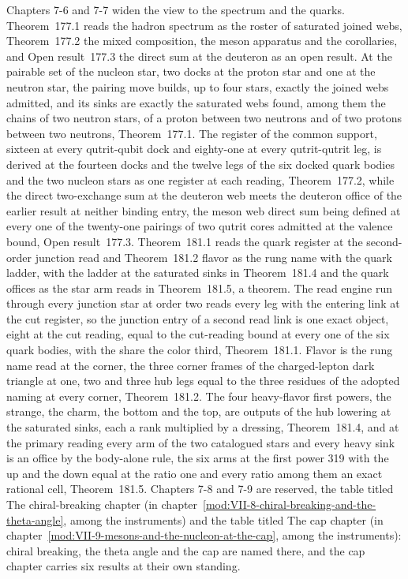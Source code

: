 Chapters 7-6 and 7-7 widen the view to the spectrum and the quarks. Theorem~177.1 reads the hadron spectrum as the roster of saturated joined webs, Theorem~177.2 the mixed composition, the meson apparatus and the corollaries, and Open result~177.3 the direct sum at the deuteron as an open result. At the pairable set of the nucleon star, two docks at the proton star and one at the neutron star, the pairing move builds, up to four stars, exactly the joined webs admitted, and its sinks are exactly the saturated webs found, among them the chains of two neutron stars, of a proton between two neutrons and of two protons between two neutrons, Theorem~177.1. The register of the common support, sixteen at every qutrit-qubit dock and eighty-one at every qutrit-qutrit leg, is derived at the fourteen docks and the twelve legs of the six docked quark bodies and the two nucleon stars as one register at each reading, Theorem~177.2, while the direct two-exchange sum at the deuteron web meets the deuteron office of the earlier result at neither binding entry, the meson web direct sum being defined at every one of the twenty-one pairings of two qutrit cores admitted at the valence bound, Open result~177.3. Theorem~181.1 reads the quark register at the second-order junction read and Theorem~181.2 flavor as the rung name with the quark ladder, with the ladder at the saturated sinks in Theorem~181.4 and the quark offices as the star arm reads in Theorem~181.5, a theorem. The read engine run through every junction star at order two reads every leg with the entering link at the cut register, so the junction entry of a second read link is one exact object, eight at the cut reading, equal to the cut-reading bound at every one of the six quark bodies, with the share the color third, Theorem~181.1. Flavor is the rung name read at the corner, the three corner frames of the charged-lepton dark triangle at one, two and three hub legs equal to the three residues of the adopted naming at every corner, Theorem~181.2. The four heavy-flavor first powers, the strange, the charm, the bottom and the top, are outputs of the hub lowering at the saturated sinks, each a rank multiplied by a dressing, Theorem~181.4, and at the primary reading every arm of the two catalogued stars and every heavy sink is an office by the body-alone rule, the six arms at the first power 319 with the up and the down equal at the ratio one and every ratio among them an exact rational cell, Theorem~181.5. Chapters 7-8 and 7-9 are reserved, the table titled The chiral-breaking chapter (in chapter~\ref{mod:VII-8-chiral-breaking-and-the-theta-angle}, among the instruments) and the table titled The cap chapter (in chapter~\ref{mod:VII-9-mesons-and-the-nucleon-at-the-cap}, among the instruments): chiral breaking, the theta angle and the cap are named there, and the cap chapter carries six results at their own standing.

